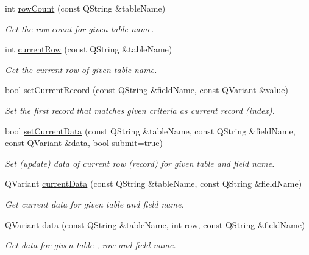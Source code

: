 \begin{DoxyCompactItemize}
int \hyperlink{classmdt_sql_form_a7d50c271fc506764ed20dd88914d0ddc}{row\-Count} (const Q\-String \&table\-Name)
\begin{DoxyCompactList}\small\item\em Get the row count for given table name. \end{DoxyCompactList}\item 
int \hyperlink{classmdt_sql_form_a855de08e9ddb3f7898ef4ceb0b0331f9}{current\-Row} (const Q\-String \&table\-Name)
\begin{DoxyCompactList}\small\item\em Get the current row of given table name. \end{DoxyCompactList}\item 
bool \hyperlink{classmdt_sql_form_a6d316991b1b4e83d5fb5b7b85f292b6b}{set\-Current\-Record} (const Q\-String \&field\-Name, const Q\-Variant \&value)
\begin{DoxyCompactList}\small\item\em Set the first record that matches given criteria as current record (index). \end{DoxyCompactList}\item 
bool \hyperlink{classmdt_sql_form_aa377e70f4a2e865b0b696957c0fca766}{set\-Current\-Data} (const Q\-String \&table\-Name, const Q\-String \&field\-Name, const Q\-Variant \&\hyperlink{classmdt_sql_form_a0c27d6a9ecbf0589f313c7193c632a62}{data}, bool submit=true)
\begin{DoxyCompactList}\small\item\em Set (update) data of current row (record) for given table and field name. \end{DoxyCompactList}\item 
Q\-Variant \hyperlink{classmdt_sql_form_aca283557b7e2586779cb5c498d388f14}{current\-Data} (const Q\-String \&table\-Name, const Q\-String \&field\-Name)
\begin{DoxyCompactList}\small\item\em Get current data for given table and field name. \end{DoxyCompactList}\item 
Q\-Variant \hyperlink{classmdt_sql_form_a0c27d6a9ecbf0589f313c7193c632a62}{data} (const Q\-String \&table\-Name, int row, const Q\-String \&field\-Name)
\begin{DoxyCompactList}\small\item\em Get data for given table , row and field name. \end{DoxyCompactList}\item 

\end{DoxyCompactItemize}
